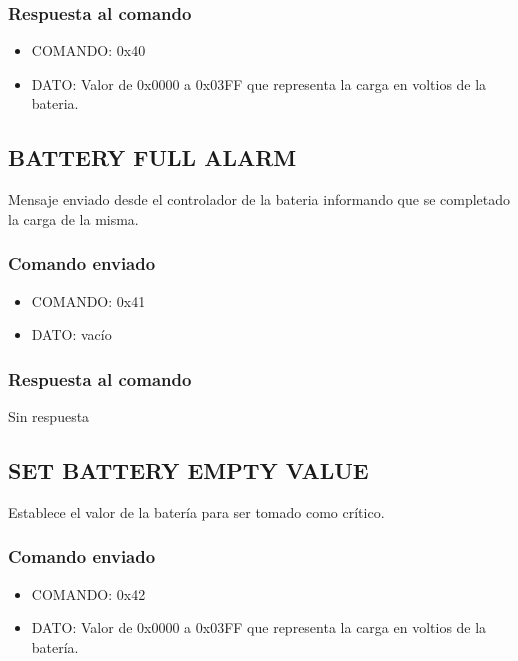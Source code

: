 \documentclass[a4paper,10pt]{article}
\begin{document}
\subsubsection*{Respuesta al comando}

\begin{itemize}
	\item{COMANDO:} 0x40
	\item{DATO:} Valor de 0x0000 a 0x03FF que representa la carga en voltios de la bateria.
\end{itemize}

\subsection{BATTERY FULL ALARM}
\label{battery_full_alarm}

Mensaje enviado desde el controlador de la bateria informando que se completado la carga de la misma.

\subsubsection*{Comando enviado}

\begin{itemize}
	\item{COMANDO:} 0x41
	\item{DATO:} vac\'io
\end{itemize}

\subsubsection*{Respuesta al comando}

Sin respuesta

\subsection{SET BATTERY EMPTY VALUE}
\label{set_battery_empty_value}

Establece el valor de la bater\'ia para ser tomado como cr\'itico.

\subsubsection*{Comando enviado}

\begin{itemize}
	\item{COMANDO:} 0x42
	\item{DATO:} Valor de 0x0000 a 0x03FF que representa la carga en voltios de la bater\'ia.
\end{itemize}
\end{document}
